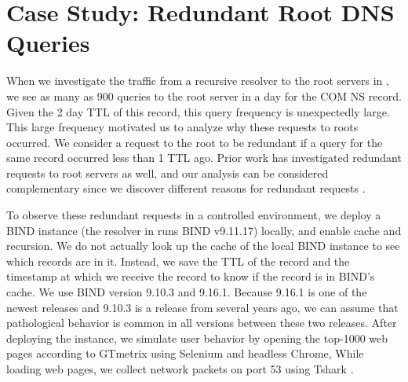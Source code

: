 \documentclass[sigconf,letterpaper,nonacm,10pt,anonymous]{acmart}
\begin{document}
\section{Case Study: Redundant Root DNS
Queries}\label{case-study-redundant-root-dns-queries-1}

\label{ap:redundant_queries}

When we investigate the traffic from a recursive resolver to the root
servers in , we see as many as 900 queries to
the root server in a day for the COM NS record. Given the 2 day TTL of
this record, this query frequency is unexpectedly large. This large
frequency motivated us to analyze why these requests to roots occurred.
We consider a request to the root to be redundant if a query for the
same record occurred less than 1 TTL ago. Prior work has investigated
redundant requests to root servers as well, and our analysis can be
considered complementary since we discover different reasons for
redundant requests \cite{gao2014reexamining}.

To observe these redundant requests in a controlled environment, we
deploy a BIND instance (the resolver in 
runs BIND v9.11.17) locally, and enable cache and recursion. We do not
actually look up the cache of the local BIND instance to see which
records are in it. Instead, we save the TTL of the record and the
timestamp at which we receive the record to know if the record is in
BIND's cache. We use BIND version 9.10.3 and 9.16.1. Because 9.16.1 is
one of the newest releases and 9.10.3 is a release from several years
ago, we can assume that pathological behavior is common in all versions
between these two releases. After deploying the instance, we simulate
user behavior by opening the top-1000 web pages according to GTmetrix
\cite{gtmetrix} using Selenium and headless Chrome, While loading web
pages, we collect network packets on port 53 using Tshark \cite{tshark}.
\end{document}
